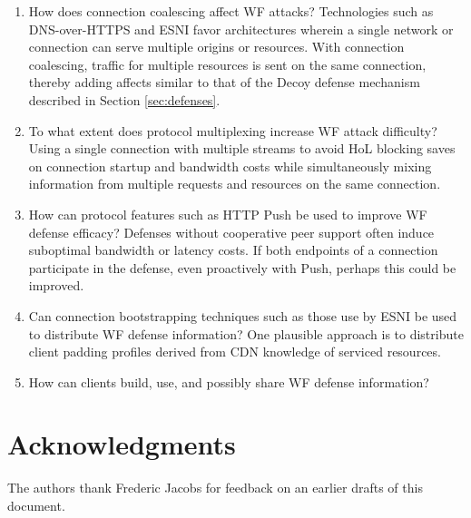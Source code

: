 \documentclass[runningheads]{llncs}
\begin{document}
\begin{enumerate}
\item How does connection coalescing affect WF attacks? Technologies such as DNS-over-HTTPS and ESNI favor 
architectures wherein a single network or connection can serve multiple origins or resources. With connection
coalescing, traffic for multiple resources is sent on the same connection, thereby adding affects similar
to that of the Decoy defense mechanism described in Section \ref{sec:defenses}. 
\item To what extent does protocol multiplexing increase WF attack difficulty? Using a single connection
with multiple streams to avoid HoL blocking saves on connection startup and bandwidth costs while simultaneously
mixing information from multiple requests and resources on the same connection. 
\item How can protocol features such as HTTP Push be used to improve WF defense efficacy? Defenses without
cooperative peer support often induce suboptimal bandwidth or latency costs. If both endpoints of a connection
participate in the defense, even proactively with Push, perhaps this could be improved.
\item Can connection bootstrapping techniques such as those use by ESNI be used to distribute WF defense 
information? One plausible approach is to distribute client padding profiles derived from CDN knowledge
of serviced resources.
\item How can clients build, use, and possibly share WF defense information? 
\end{enumerate}

\section{Acknowledgments}
The authors thank Frederic Jacobs for feedback on an earlier drafts of this document.



\end{document}
